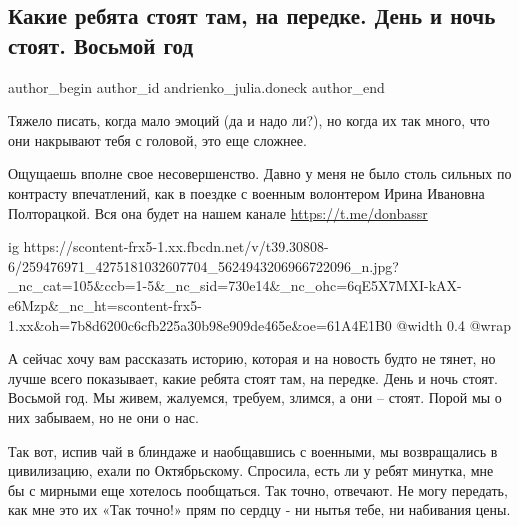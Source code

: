  
 
 
 
 
 
\subsection{Какие ребята стоят там, на передке. День и ночь стоят. Восьмой год}
\label{sec:24_11_2021.fb.andrienko_julia.doneck.1.front}
 
\ifcmt
 author_begin
   author_id andrienko_julia.doneck
 author_end
\fi

Тяжело писать, когда мало эмоций (да и надо ли?), но когда их так много, что
они накрывают тебя с головой, это еще сложнее. 

Ощущаешь вполне свое несовершенство. Давно у меня не было столь сильных по
контрасту впечатлений, как в поездке с военным волонтером Ирина Ивановна
Полторацкой. Вся она будет на нашем канале \url{https://t.me/donbassr} 

\ifcmt
  ig https://scontent-frx5-1.xx.fbcdn.net/v/t39.30808-6/259476971_4275181032607704_5624943206966722096_n.jpg?_nc_cat=105&ccb=1-5&_nc_sid=730e14&_nc_ohc=6qE5X7MXI-kAX-e6Mzp&_nc_ht=scontent-frx5-1.xx&oh=7b8d6200c6cfb225a30b98e909de465e&oe=61A4E1B0
  @width 0.4
  @wrap 
\fi

А сейчас хочу вам рассказать историю, которая и на новость будто не тянет, но
лучше всего показывает, какие ребята стоят там, на передке. День и ночь стоят.
Восьмой год. Мы живем, жалуемся, требуем, злимся, а они – стоят. Порой мы о них
забываем, но не они о нас. 

Так вот, испив чай в блиндаже и наобщавшись с военными, мы возвращались в
цивилизацию, ехали по Октябрьскому. Спросила, есть ли у ребят минутка, мне бы с
мирными еще хотелось пообщаться. Так точно, отвечают. Не могу передать, как мне
это их «Так точно!» прям по сердцу - ни нытья тебе, ни набивания цены.

